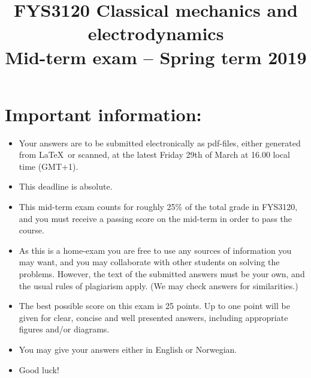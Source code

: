 \documentclass[11pt,a4paper]{report}
\title{FYS3120 Classical mechanics and electrodynamics\\
Mid-term exam -- Spring term 2019}
\author{}
\begin{document}
\maketitle


\addtocounter{page}{1}

\section*{Important information:}
\begin{itemize}
\item
Your answers are to be submitted electronically as pdf-files, either generated from \LaTeX\  or scanned, at the latest Friday 29th of March at 16.00 local time (GMT+1). 
\item
This deadline is absolute.
\item
This mid-term exam counts for roughly  25\% of the total grade in FYS3120, and you must receive a passing score on the mid-term in order to pass the course.
\item
As this is a home-exam you are free to use any sources of information you may want, and you may collaborate with other students on solving the problems. However, the text of the submitted answers must be your own, and the usual rules of plagiarism apply. (We may check answers for similarities.)
\item
The best possible score on this exam is 25 points. Up to one point will be given for clear, concise and well presented answers, including appropriate figures and/or diagrams.
\item 
You may give your answers either in English or Norwegian.
\item
Good luck!
\end{itemize}

\cleardoublepage
\end{document}
